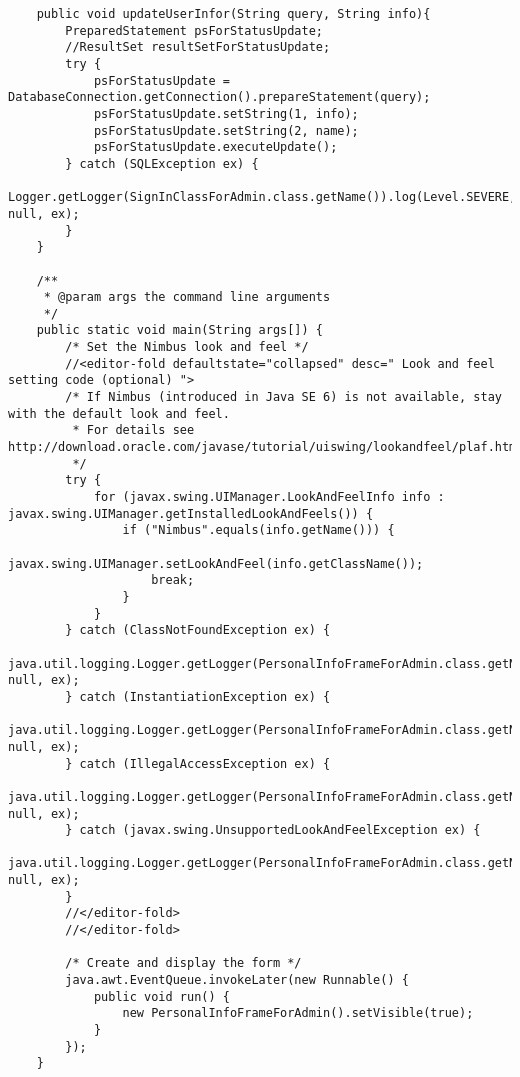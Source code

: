 \documentclass[12pt,a4paper]{article}
\begin{document}
\begin{lstlisting}
    public void updateUserInfor(String query, String info){
        PreparedStatement psForStatusUpdate;
        //ResultSet resultSetForStatusUpdate;
        try {
            psForStatusUpdate = DatabaseConnection.getConnection().prepareStatement(query);
            psForStatusUpdate.setString(1, info);
            psForStatusUpdate.setString(2, name);
            psForStatusUpdate.executeUpdate();
        } catch (SQLException ex) {
            Logger.getLogger(SignInClassForAdmin.class.getName()).log(Level.SEVERE, null, ex);
        }
    }

    /**
     * @param args the command line arguments
     */
    public static void main(String args[]) {
        /* Set the Nimbus look and feel */
        //<editor-fold defaultstate="collapsed" desc=" Look and feel setting code (optional) ">
        /* If Nimbus (introduced in Java SE 6) is not available, stay with the default look and feel.
         * For details see http://download.oracle.com/javase/tutorial/uiswing/lookandfeel/plaf.html 
         */
        try {
            for (javax.swing.UIManager.LookAndFeelInfo info : javax.swing.UIManager.getInstalledLookAndFeels()) {
                if ("Nimbus".equals(info.getName())) {
                    javax.swing.UIManager.setLookAndFeel(info.getClassName());
                    break;
                }
            }
        } catch (ClassNotFoundException ex) {
            java.util.logging.Logger.getLogger(PersonalInfoFrameForAdmin.class.getName()).log(java.util.logging.Level.SEVERE, null, ex);
        } catch (InstantiationException ex) {
            java.util.logging.Logger.getLogger(PersonalInfoFrameForAdmin.class.getName()).log(java.util.logging.Level.SEVERE, null, ex);
        } catch (IllegalAccessException ex) {
            java.util.logging.Logger.getLogger(PersonalInfoFrameForAdmin.class.getName()).log(java.util.logging.Level.SEVERE, null, ex);
        } catch (javax.swing.UnsupportedLookAndFeelException ex) {
            java.util.logging.Logger.getLogger(PersonalInfoFrameForAdmin.class.getName()).log(java.util.logging.Level.SEVERE, null, ex);
        }
        //</editor-fold>
        //</editor-fold>

        /* Create and display the form */
        java.awt.EventQueue.invokeLater(new Runnable() {
            public void run() {
                new PersonalInfoFrameForAdmin().setVisible(true);
            }
        });
    }


\end{lstlisting}
\end{document}
